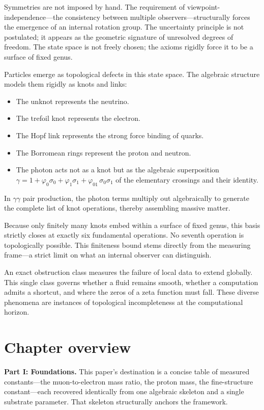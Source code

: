 Symmetries are not imposed by hand. The requirement of viewpoint-independence—the consistency between multiple observers—structurally forces the emergence of an internal rotation group. The uncertainty principle is not postulated; it appears as the geometric signature of unresolved degrees of freedom. The state space is not freely chosen; the axioms rigidly force it to be a surface of fixed genus.

Particles emerge as topological defects in this state space. The algebraic structure models them rigidly as knots and links:

\begin{itemize}
  \item The unknot represents the neutrino.
  \item The trefoil knot represents the electron.
  \item The Hopf link represents the strong force binding of quarks.
  \item The Borromean rings represent the proton and neutron.
  \item The photon acts not as a knot but as the algebraic superposition $\gamma =\allowbreak{} 1 +\allowbreak{} \varphi_0\sigma_0 +\allowbreak{} \varphi_1\sigma_1 +\allowbreak{} \varphi_{01}\,\sigma_0\sigma_1$ of the elementary crossings and their identity.
\end{itemize}

In $\gamma\gamma$ pair production, the photon terms multiply out algebraically to generate the complete list of knot operations, thereby assembling massive matter.

Because only finitely many knots embed within a surface of fixed genus, this basis strictly closes at exactly six fundamental operations. No seventh operation is topologically possible. This finiteness bound stems directly from the measuring frame—a strict limit on what an internal observer can distinguish.

An exact obstruction class measures the failure of local data to extend globally. This single class governs whether a fluid remains smooth, whether a computation admits a shortcut, and where the zeros of a zeta function must fall. These diverse phenomena are instances of topological incompleteness at the computational horizon.

\section{Chapter overview}
\label{sec:chapter-overview}
\textbf{Part I: Foundations.}
This paper's destination is a concise table of measured constants—the muon-to-electron mass ratio, the proton mass, the fine-structure constant—each recovered identically from one algebraic skeleton and a single substrate parameter. That skeleton structurally anchors the framework.

